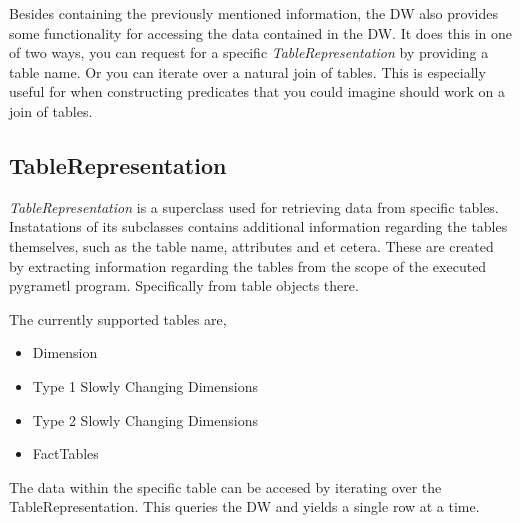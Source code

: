 Besides containing the previously mentioned information, the DW also provides some functionality for accessing the data contained in the DW. It does this in one of two ways, you can request for a specific \textit{TableRepresentation} by providing a table name. Or you can iterate over a natural join of tables. This is especially useful for when constructing predicates that you could imagine should work on a join of tables.

\subsection{TableRepresentation}
\textit{TableRepresentation} is a superclass used for retrieving data from specific tables. Instatations of its subclasses contains additional information regarding the tables themselves, such as the table name, attributes and et cetera. These are created by extracting information regarding the tables from the scope of the executed pygrametl program. Specifically from table objects there. 

The currently supported tables are,

\begin{itemize}
\item Dimension
\item Type 1 Slowly Changing Dimensions
\item Type 2 Slowly Changing Dimensions
\item FactTables
\end{itemize}

The data within the specific table can be accesed by iterating over the TableRepresentation. This queries the DW and yields a single row at a time.
